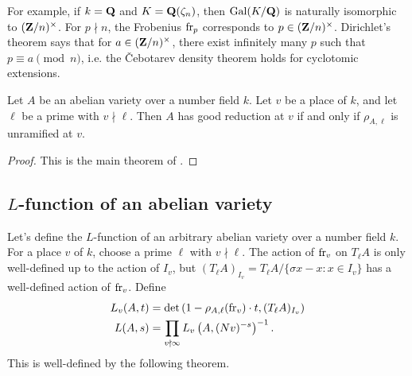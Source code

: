 For example, if $k=\mathbf{Q}$ and $K=\mathbf{Q}(\zeta_n)$, then $\operatorname{Gal}(K/\mathbf{Q})$ is naturally 
isomorphic to $(\mathbf{Z}/n)^\times$. For $p\nmid n$, the Frobenius $\mathrm{fr}_p$ 
corresponds to $p\in (\mathbf{Z}/n)^\times$. Dirichlet's theorem says that for 
$a\in (\mathbf{Z}/n)^\times$, there exist infinitely many $p$ such that 
$p\equiv a\pmod n$, i.e. the \v Cebotarev density theorem holds for cyclotomic 
extensions. 

\begin{theorem}
Let $A$ be an abelian variety over a number field $k$. Let $v$ be a place of 
$k$, and let $\ell$ be a prime with $v\nmid \ell$. Then $A$ has good reduction 
at $v$ if and only if $\rho_{A,\ell}$ is unramified at $v$. 
\end{theorem}
\begin{proof}
This is the main theorem of \cite{st68}. 
\end{proof}





\subsection{\texorpdfstring{$L$}{L}-function of an abelian variety}

Let's define the $L$-function of an arbitrary abelian variety over a number 
field $k$. For a place $v$ of $k$, choose a prime $\ell$ with $v\nmid \ell$. 
The action of $\mathrm{fr}_v$ on $T_\ell A$ is only well-defined up to the action of 
$I_v$, but $(T_\ell A)_{I_v} = T_\ell A / \{\sigma x-x:x\in I_v\}$ has a 
well-defined action of $\mathrm{fr}_v$. Define
\begin{align*}
  L_v(A,t) &= \det\left(1-\rho_{A,\ell}(\mathrm{fr}_v)\cdot t,(T_\ell A)_{I_v}\right) \\
  L(A,s) &= \prod_{v\nmid \infty} L_v\left(A,(N v)^{-s}\right)^{-1} \text{.}
\end{align*}
This is well-defined by the following theorem. 

